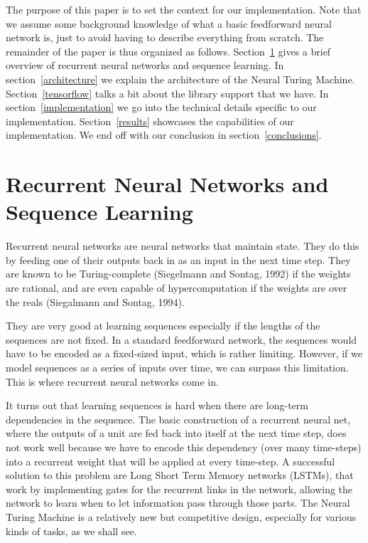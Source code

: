 \documentclass[12pt]{article}
\begin{document}
The purpose of this paper is to set the context for our implementation.
Note that we assume some background knowledge of what a basic feedforward
neural network is, just to avoid having to describe everything from scratch.
The remainder of the paper is thus organized as follows.
Section~\ref{sequence} gives a brief overview of recurrent
neural networks and sequence learning.
In section~\ref{architecture} we explain the architecture of the Neural
Turing Machine. Section~\ref{tensorflow} talks a bit about the library
support that we have. In section~\ref{implementation} we
go into the technical details specific to our implementation.
Section~\ref{results} showcases the capabilities of our implementation.
We end off with our conclusion in section~\ref{conclusions}.

\section{Recurrent Neural Networks and Sequence Learning}\label{sequence}

Recurrent neural networks are neural networks that maintain state. They
do this by feeding one of their outputs back in as an input in the next time
step. They are known to be Turing-complete (Siegelmann and Sontag, 1992)\cite{Siegelmann:1992:CPN:130385.130432}
if the weights are rational, and are even capable of hypercomputation
if the weights are over the reals (Siegalmann and Sontag, 1994)\cite{SIEGELMANN1994331}.

They are very good at learning sequences especially if the lengths of
the sequences are not fixed. In a standard feedforward network, the
sequences would have to be encoded as a fixed-sized input, which is rather
limiting. However, if we model sequences as a series of inputs over time,
we can surpass this limitation. This is where recurrent neural networks come
in.

It turns out that learning sequences is hard when there are long-term
dependencies in the sequence. The basic construction of a recurrent
neural net, where the outputs of a unit are fed back into itself at the next
time step, does not work well because we have to encode this dependency
(over many time-steps) into a recurrent weight that will be applied at every
time-step. A successful solution to this problem are Long Short Term Memory
networks (LSTMs), that work by implementing gates for the recurrent 
links in the network, allowing the network to learn when to let information
pass through those parts. The Neural Turing Machine is a relatively new
but competitive design, especially for various kinds of tasks, as we
shall see.
\end{document}
